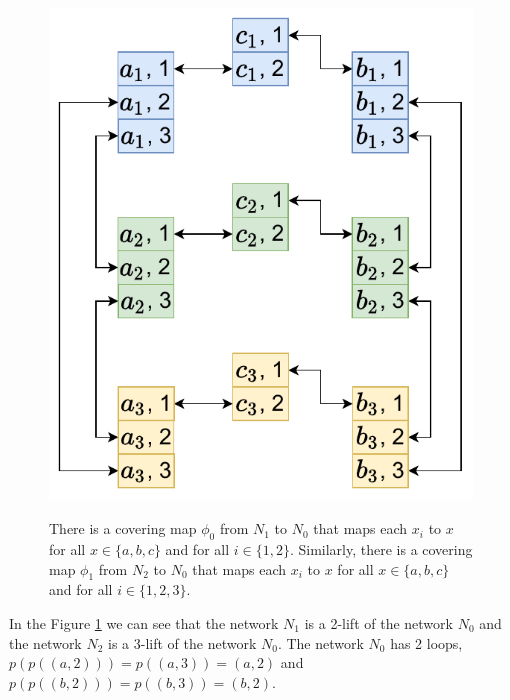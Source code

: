 \begin{figure}[H]
{    \includegraphics[scale=0.46]{diagrams/covering_map_5c.pdf}
  }
  \caption{
    There is a covering map $\phi_0$ from $N_1$ to $N_0$ that maps each $x_i$ to $x$ for all $x \in \{a, b, c\}$ and for all $i \in \{1, 2\}$.
    Similarly, there is a covering map $\phi_1$ from $N_2$ to $N_0$ that maps each $x_i$ to $x$ for all $x \in \{a, b, c\}$ and for all $i \in \{1, 2, 3\}$.
  }
  \label{fig:covering_map3}
\end{figure}

In the Figure \ref{fig:covering_map3} we can see that the network $N_1$ is a 2-lift of the network $N_0$ and the network $N_2$ is a 3-lift of the network $N_0$.
The network $N_0$ has 2 loops, $p(p((a, 2))) = p((a, 3)) = (a, 2)$ and $p(p((b, 2))) = p((b, 3)) = (b, 2)$.




